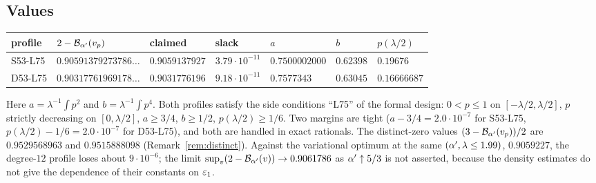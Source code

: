 \subsection{Values}
\begin{center}\small
\begin{tabular}{@{}lllllll@{}}
\toprule
profile & $2-\mathcal B_{\alpha'}(v_p)$ & claimed & slack & $a$ & $b$ & $p(\lambda/2)$\\
\midrule
S53-L75 & $0.90591379273786\ldots$ & $0.9059137927$ & $3.79\cdot10^{-11}$ & $0.7500002000$ & $0.62398$ & $0.19676$\\
D53-L75 & $0.90317761969178\ldots$ & $0.9031776196$ & $9.18\cdot10^{-11}$ & $0.7577343$ & $0.63045$ & $0.16666687$\\
\bottomrule
\end{tabular}
\end{center}
Here $a=\lambda^{-1}\int p^2$ and $b=\lambda^{-1}\int p^4$. Both profiles satisfy the side conditions ``L75'' of the formal design: $0<p\le1$ on $[-\lambda/2,\lambda/2]$, $p$ strictly
decreasing on $[0,\lambda/2]$, $a\ge3/4$, $b\ge1/2$, $p(\lambda/2)\ge1/6$. Two margins are tight ($a-3/4=2.0\cdot10^{-7}$ for S53-L75, $p(\lambda/2)-1/6=2.0\cdot10^{-7}$ for
D53-L75), and both are handled in exact rationals. The distinct-zero values $(3-\mathcal B_{\alpha'}(v_p))/2$ are $0.9529568963$ and $0.9515888098$ (Remark~\ref{rem:distinct}).
Against the variational optimum at the same $(\alpha',\lambda\le1.99)$, $0.9059227$, the degree-$12$ profile loses about $9\cdot10^{-6}$; the limit
$\sup_v(2-\mathcal B_{\alpha'}(v))\to0.9061786$ as $\alpha'\uparrow5/3$ is not asserted, because the density estimates do not give the dependence of their constants on
$\varepsilon_1$.

